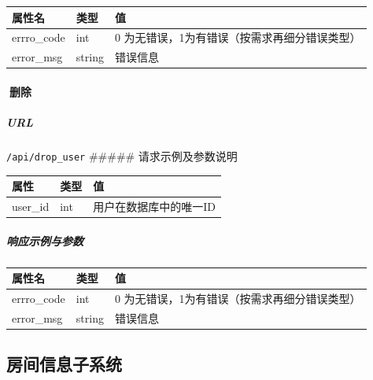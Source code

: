 \documentclass[]{article}
\let\oldparagraph\paragraph
\renewcommand{\paragraph}[1]{\oldparagraph{#1}\mbox{}}
\let\oldsubparagraph\subparagraph
\renewcommand{\subparagraph}[1]{\oldsubparagraph{#1}\mbox{}}
\begin{document}
\begin{longtable}[]{@{}lll@{}}
\toprule
属性名 & 类型 & 值\tabularnewline
\midrule
\endhead
errro\_code & int & 0
为无错误，1为有错误（按需求再细分错误类型）\tabularnewline
error\_msg & string & 错误信息\tabularnewline
\bottomrule
\end{longtable}

\hypertarget{ux5220ux9664}{%
\paragraph{删除}\label{ux5220ux9664}}

\hypertarget{url-11}{%
\subparagraph{URL}\label{url-11}}

\texttt{/api/drop\_user} \#\#\#\#\# 请求示例及参数说明

\begin{Shaded}
\begin{Highlighting}[]
\FunctionTok{\{}
    \FunctionTok{:} \FunctionTok{,}
\FunctionTok{\}}
\end{Highlighting}
\end{Shaded}

\begin{longtable}[]{@{}lll@{}}
\toprule
属性 & 类型 & 值\tabularnewline
\midrule
\endhead
user\_id & int & 用户在数据库中的唯一ID\tabularnewline
\bottomrule
\end{longtable}

\hypertarget{ux54cdux5e94ux793aux4f8bux4e0eux53c2ux6570-6}{%
\subparagraph{响应示例与参数}\label{ux54cdux5e94ux793aux4f8bux4e0eux53c2ux6570-6}}

\begin{Shaded}
\begin{Highlighting}[]
\FunctionTok{\{}
    \FunctionTok{:}\FunctionTok{,}
    \FunctionTok{:}
\FunctionTok{\}}
\end{Highlighting}
\end{Shaded}

\begin{longtable}[]{@{}lll@{}}
\toprule
属性名 & 类型 & 值\tabularnewline
\midrule
\endhead
errro\_code & int & 0
为无错误，1为有错误（按需求再细分错误类型）\tabularnewline
error\_msg & string & 错误信息\tabularnewline
\bottomrule
\end{longtable}

\hypertarget{ux623fux95f4ux4fe1ux606fux5b50ux7cfbux7edf}{%
\subsection{房间信息子系统}\label{ux623fux95f4ux4fe1ux606fux5b50ux7cfbux7edf}}
\end{document}
